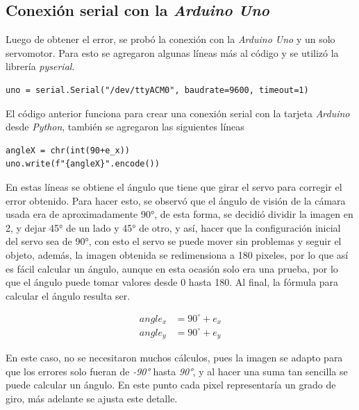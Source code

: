 \documentclass[12pt, oneside]{article}
\begin{document}
\subsection{Conexión serial con la \emph{Arduino Uno}}
{\sffamily\large\justify
    \hspace{0.5cm} Luego de obtener el error, se probó la conexión con la
    \emph{Arduino Uno} y un solo servomotor. Para esto se agregaron algunas líneas más
    al código y se utilizó la librería \emph{pyserial}.

    \begin{lstlisting}[style=pythonScript]
uno = serial.Serial("/dev/ttyACM0", baudrate=9600, timeout=1)
    \end{lstlisting}

    \hspace{0.5cm} El código anterior funciona para crear una conexión serial con la
    tarjeta \emph{Arduino} desde \emph{Python}, también se agregaron las siguientes
    líneas

    \begin{lstlisting}[style=pythonScript]
angleX = chr(int(90+e_x))
uno.write(f"{angleX}".encode())
    \end{lstlisting}

    \hspace{0.5cm} En estas líneas se obtiene el ángulo que tiene que girar el servo
    para corregir el error obtenido. Para hacer esto, se observó que el ángulo de visión
    de la cámara usada era de aproximadamente 90°, de esta forma, se decidió dividir
    la imagen en 2, y dejar 45° de un lado y 45° de otro, y así, hacer que la
    configuración inicial del servo sea de 90°, con esto el servo se puede mover sin
    problemas y seguir el objeto, además, la imagen obtenida se redimensiona a 180
    pixeles, por lo que así es fácil calcular un ángulo, aunque en esta ocasión solo era
    una prueba, por lo que el ángulo puede tomar valores desde 0 hasta 180. Al final, la
    fórmula para calcular el ángulo resulta ser.

    \begin{equation*}
        \begin{split}
            angle_x & = 90^\circ + e_x \\
            angle_y & = 90^\circ + e_y
        \end{split}
    \end{equation*}

    \hspace{0.5cm} En este caso, no se necesitaron muchos cálculos, pues la imagen se
    adapto para que los errores solo fueran de \emph{-90°} hasta \emph{90°}, y al hacer
    una suma tan sencilla se puede calcular un ángulo. En este punto cada pixel
    representaría un grado de giro, más adelante se ajusta este detalle.

}
\end{document}
